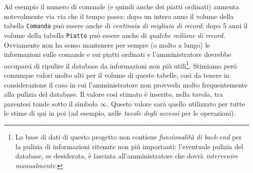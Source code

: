 Ad esempio il numero di comande (e quindi anche dei piatti ordinati) aumenta notevolmente
via via che il tempo passa: dopo un intero anno il volume della tabella {\tt Comanda} può essere
anche di {\it centinaia di migliaia di record}; dopo 5 anni il volume della tabella {\tt Piatto} può
essere anche di {\it qualche milione di record}. Ovviamente non ha senso mantenere per sempre (o
molto a lungo) le informazioni sulle comande e sui piatti ordinati e l'amministratore
dovrebbe occuparsi di ripulire il database da informazioni non più utili\footnote{La base di %
dati di questo progetto non contiene {\it funzionalità di back-end} per la pulizia di informazioni %
ritenute non più importanti: l'eventuale pulizia del database, se desiderata, è lasciata %
all'amministratore che dovrà {\it intervenire manualmente}.}. Stimiamo però comunque
valori molto alti per il volume di queste tabelle, così da tenere in considerazione il
caso in cui l'amministratore non provveda molto frequentemente alla pulizia del database. Il
valore così stimato è inserito, nella tavola, tra parentesi tonde sotto il simbolo \(\infty\). Questo
valore sarà quello utilizzato per tutte le stime di qui in poi (ad esempio, nelle
{\it tavole degli accessi} per le operazioni).
